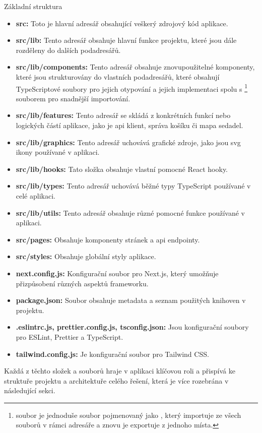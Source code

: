 \begin{subsection}{Základní struktura}
    \begin{itemize}
        \item \textbf{src:} Toto je hlavní adresář obsahující veškerý zdrojový kód aplikace.
        \item \textbf{src/lib:} Tento adresář obsahuje hlavní funkce projektu, které jsou dále rozděleny do dalších podadresářů.
        \item \textbf{src/lib/components:} Tento adresář obsahuje znovupoužitelné komponenty, které jsou strukturovány do vlastních podadresářů, které obsahují TypeScriptové soubory pro jejich otypování a jejich implementaci spolu s \footnote{ soubor je jednoduše soubor pojmenovaný jako , který importuje ze všech souborů v rámci adresáře a znovu je exportuje z jednoho místa.} souborem pro snadnější importování.
        \item \textbf{src/lib/features:} Tento adresář se skládá z konkrétních funkcí nebo logických částí aplikace, jako je \ac{api} klient, správa košíku či mapa sedadel.
        \item \textbf{src/lib/graphics:} Tento adresář uchovává grafické zdroje, jako jsou \ac{svg} ikony používané v aplikaci.
        \item \textbf{src/lib/hooks:} Tato složka obsahuje vlastní pomocné React hooky.
        \item \textbf{src/lib/types:} Tento adresář uchovává běžné typy TypeScript používané v celé aplikaci.
        \item \textbf{src/lib/utils:} Tento adresář obsahuje různé pomocné funkce používané v aplikaci.
        \item \textbf{src/pages:} Obsahuje komponenty stránek a \ac{api} endpointy.
        \item \textbf{src/styles:} Obsahuje globální styly aplikace.
        \item \textbf{next.config.js:} Konfigurační soubor pro Next.js, který umožňuje přizpůsobení různých aspektů frameworku.
        \item \textbf{package.json:} Soubor obsahuje metadata a seznam použitých knihoven v projektu.
        \item \textbf{.eslintrc.js, prettier.config.js, tsconfig.json:} Jsou konfigurační soubory pro ESLint, Prettier a TypeScript.
        \item \textbf{tailwind.config.js:} Je konfigurační soubor pro Tailwind CSS\@.
    \end{itemize}

    Každá z těchto složek a souborů hraje v aplikaci klíčovou roli a přispívá ke struktuře projektu a architektuře celého řešení, která je více rozebrána v následující sekci.
\end{subsection}

